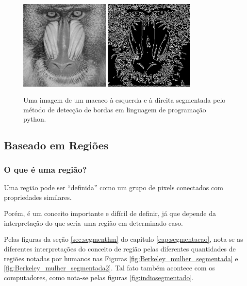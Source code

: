 \begin{figure}[!htb]
 \centering
 \def\baselinestretch{1}\small\normalsize
 \includegraphics[width=0.4\textwidth]{img/stf-smandrill.jpg}\qquad
 \includegraphics[width=0.4\textwidth]{img/stf-smandrill-edgedetect.jpg} 
 \caption{\label{fig:smandrill} Uma imagem de um macaco \citep{stanford} à esquerda e à direita segmentada pelo método de detecção de bordas em linguagem de programação python.}
\end{figure}


\subsection{Baseado em Regiões}
\subsubsection*{O que é uma região?}
Uma região pode ser “definida” como um grupo de pixels conectados com propriedades similares.

Porém, é um conceito importante e difícil de definir, já que depende da interpretação do que seria uma região  em determinado caso.

Pelas figuras da seção \ref{sec:segmenthm} do capitulo \ref{cap:segmentacao}, nota-se as diferentes interpretações do conceito de região pelas diferentes quantidades de regiões notadas por humanos nas Figuras \ref{fig:Berkeley_mulher_segmentada} e \ref{fig:Berkeley_mulher_segmentada2}. Tal fato também acontece com os computadores, como nota-se pelas figuras \ref{fig:indiosegmentado}.

